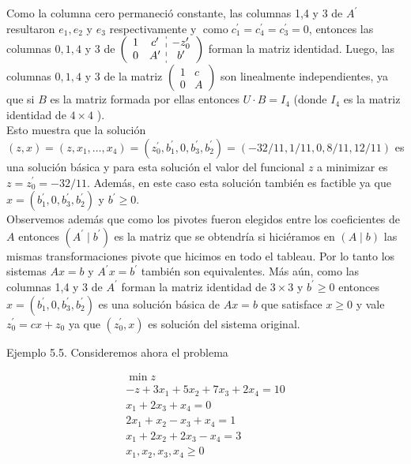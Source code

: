 \documentclass[10pt]{article}
\begin{document}
Como la columna cero permaneció constante, las columnas 1,4 y 3 de $A^{\prime}$ resultaron $e_{1}, e_{2}$ y $e_{3}$ respectivamente y $\operatorname{como} c_{1}^{\prime}=c_{4}^{\prime}=c_{3}^{\prime}=0$, entonces las columnas $0,1,4$ y 3 de $\left(\begin{array}{cc:c}1 & c^{\prime} & -z_{0}^{\prime} \\ 0 & A^{\prime} & b^{\prime}\end{array}\right)$ forman la matriz identidad. Luego, las columnas $0,1,4$ y 3 de la matriz $\left(\begin{array}{cc}1 & c \\ 0 & A\end{array}\right)$ son linealmente independientes, ya que si $B$ es la matriz formada por ellas entonces $U \cdot B=I_{4}$ (donde $I_{4}$ es la matriz identidad de $4 \times 4$ ).\\
Esto muestra que la solución $(z, x)=\left(z, x_{1}, \ldots, x_{4}\right)=\left(z_{0}^{\prime}, b_{1}^{\prime}, 0, b_{3}^{\prime}, b_{2}^{\prime}\right)=(-32 / 11,1 / 11,0,8 / 11,12 / 11)$ es una solución básica y para esta solución el valor del funcional $z$ a minimizar es $z=z_{0}^{\prime}=-32 / 11$. Además, en este caso esta solución también es factible ya que $x=\left(b_{1}^{\prime}, 0, b_{3}^{\prime}, b_{2}^{\prime}\right)$ y $b^{\prime} \geq 0$.\\
Observemos además que como los pivotes fueron elegidos entre los coeficientes de $A$ entonces $\left(A^{\prime} \mid b^{\prime}\right)$ es la matriz que se obtendría si hiciéramos en $(A \mid b)$ las mismas transformaciones pivote que hicimos en todo el tableau. Por lo tanto los sistemas $A x=b$ y $A^{\prime} x=b^{\prime}$ también son equivalentes. Más aún, como las columnas 1,4 y 3 de $A^{\prime}$ forman la matriz identidad de $3 \times 3$ y $b^{\prime} \geq 0$ entonces $x=\left(b_{1}^{\prime}, 0, b_{3}^{\prime}, b_{2}^{\prime}\right)$ es una solución básica de $A x=b$ que satisface $x \geq 0$ y vale $z_{0}^{\prime}=c x+z_{0}$ ya que $\left(z_{0}^{\prime}, x\right)$ es solución del sistema original.

Ejemplo 5.5. Consideremos ahora el problema

$$
\begin{gathered}
\min z \\
-z+3 x_{1}+5 x_{2}+7 x_{3}+2 x_{4}=10 \\
x_{1}+2 x_{3}+x_{4}=0 \\
2 x_{1}+x_{2}-x_{3}+x_{4}=1 \\
x_{1}+2 x_{2}+2 x_{3}-x_{4}=3 \\
x_{1}, x_{2}, x_{3}, x_{4} \geq 0
\end{gathered}
$$
\end{document}
